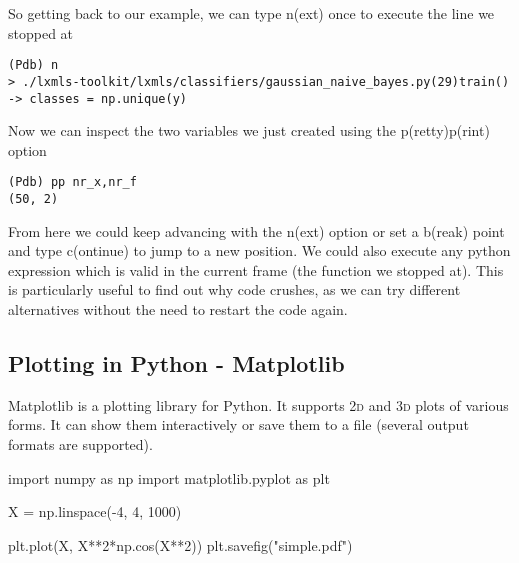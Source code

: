 
So getting back to our example, we can type n(ext) once to execute the line we stopped at

\begin{verbatim}
(Pdb) n
> ./lxmls-toolkit/lxmls/classifiers/gaussian_naive_bayes.py(29)train()
-> classes = np.unique(y)
\end{verbatim}

Now we can inspect the two variables we just created using the p(retty)p(rint) option

\begin{verbatim}
(Pdb) pp nr_x,nr_f
(50, 2)
\end{verbatim}

From here we could keep advancing with the n(ext) option or set a b(reak) point and type c(ontinue) to jump to a new position. We could also execute any python expression which is valid in the current frame (the function we stopped at). This is particularly useful to find out why code crushes, as we can try different alternatives without the need to restart the code again.

\subsection{Plotting in Python - Matplotlib}

Matplotlib is a plotting library for Python. It supports \textsc{2d} and
\textsc{3d} plots of various forms. It can show them interactively or save them
to a file (several output formats are supported).

\begin{python}
import numpy as np
import matplotlib.pyplot as plt

X = np.linspace(-4, 4, 1000)

plt.plot(X, X**2*np.cos(X**2))
plt.savefig("simple.pdf")
\end{python}


